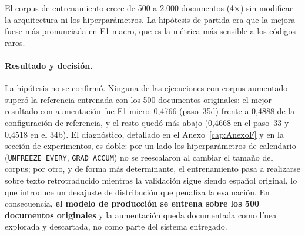 El corpus de entrenamiento crece de 500 a 2.000 documentos (4×) sin modificar la arquitectura ni los hiperparámetros. La hipótesis de partida era que la mejora fuese más pronunciada en F1-macro, que es la métrica más sensible a los códigos raros.

\paragraph{Resultado y decisión.} La hipótesis no se confirmó. Ninguna de las ejecuciones con corpus aumentado superó la referencia entrenada con los 500 documentos originales: el mejor resultado con aumentación fue F1-micro~0,4766 (paso~35d) frente a 0,4888 de la configuración de referencia, y el resto quedó más abajo (0,4668 en el paso~33 y 0,4518 en el 34b). El diagnóstico, detallado en el Anexo~\ref{cap:AnexoF} y en la sección de experimentos, es doble: por un lado los hiperparámetros de calendario (\texttt{UNFREEZE\_EVERY}, \texttt{GRAD\_ACCUM}) no se reescalaron al cambiar el tamaño del corpus; por otro, y de forma más determinante, el entrenamiento pasa a realizarse sobre texto retrotraducido mientras la validación sigue siendo español original, lo que introduce un desajuste de distribución que penaliza la evaluación. En consecuencia, \textbf{el modelo de producción se entrena sobre los 500 documentos originales} y la aumentación queda documentada como línea explorada y descartada, no como parte del sistema entregado.
